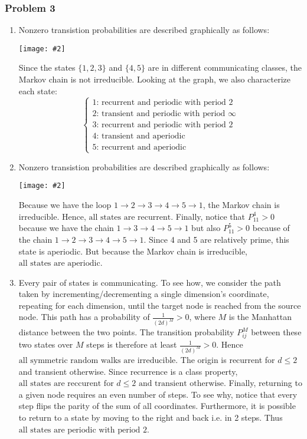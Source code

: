 \documentclass[letterpaper,12pt]{article}
\newcommand*{\qimg}[2]{\\ \begin{center}\texttt{[image: \#2]}\end{center}}
\begin{document}
\begin{flushleft}
    \subsubsection*{Problem 3}
    \begin{enumerate}[label=(\alph*)]

        \item
        Nonzero transistion probabilities are described graphically as follows:
        \qimg{0.8}{img/q3a.jpg}
        Since the states $\{1, 2, 3\}$ and $\{4, 5\}$ are in different communicating classes, the Markov chain is $\boxed{\text{not irreducible}}$. Looking at the graph, we also characterize each state:
        $$\boxed{\begin{cases}
            \text{1: recurrent and periodic with period 2} \\
            \text{2: transient and periodic with period } \infty \\
            \text{3: recurrent and periodic with period 2} \\
            \text{4: transient and aperiodic} \\
            \text{5: recurrent and aperiodic}
        \end{cases}}$$

        \item
        Nonzero transistion probabilities are described graphically as follows:
        \qimg{0.8}{img/q3b.jpg}
        Because we have the loop $1 \rightarrow 2 \rightarrow 3 \rightarrow 4 \rightarrow 5 \rightarrow 1$, the Markov chain is $\boxed{\text{irreducible}}$. Hence, $\boxed{\text{all states are recurrent}}$. Finally, notice that $P_{11}^4 > 0$ because we have the chain $1 \rightarrow 3 \rightarrow 4 \rightarrow 5 \rightarrow 1$ but also $P_{11}^5 > 0$ because of the chain $1 \rightarrow 2 \rightarrow 3 \rightarrow 4 \rightarrow 5 \rightarrow 1$. Since 4 and 5 are relatively prime, this state is aperiodic. But because the Markov chain is irreducible, $\boxed{\text{all states are aperiodic}}$.

        \item
        Every pair of states is communicating. To see how, we consider the path taken by incrementing/decrementing a single dimension's coordinate, repeating for each dimension, until the target node is reached from the source node. This path has a probability of $\frac{1}{(2d)^M} > 0$, where $M$ is the Manhattan distance between the two points. The transition probability $P_{ij}^M$ between these two states over $M$ steps is therefore at least $\frac{1}{(2d)^M} > 0$. Hence $\boxed{\text{all symmetric random walks are irreducible}}$. The origin is recurrent for $d \leq 2$ and transient otherwise. Since recurrence is a class property, $\boxed{\text{all states are reccurent for } d \leq 2 \text{ and transient otherwise}}$. Finally, returning to a given node requires an even number of steps. To see why, notice that every step flips the parity of the sum of all coordinates. Furthermore, it is possible to return to a state by moving to the right and back i.e. in 2 steps. Thus $\boxed{\text{all states are periodic with period 2}}$.


\end{enumerate}
\end{flushleft}
\end{document}
